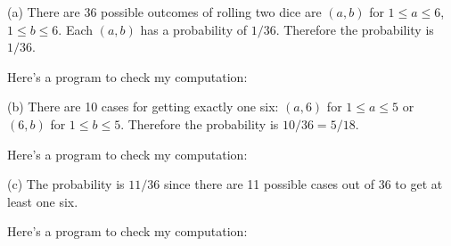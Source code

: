 
(a)
There are 36 possible outcomes of rolling two dice are $(a, b)$
for
$1 \leq a \leq 6$, 
$1 \leq b \leq 6$.
Each $(a, b)$ has a probability of $1/36$.
Therefore the probability is $1/36$.

Here's a program to check my computation:


(b)
There are 10 cases for getting exactly one six:
$(a, 6)$ for $1 \leq a \leq 5$ or
$(6, b)$ for $1 \leq b \leq 5$.
Therefore the probability is $10/36 = 5/18$.

Here's a program to check my computation:


(c)
The probability is $11/36$ since there are 11 possible cases out of 36
to get at least one six.

Here's a program to check my computation:

